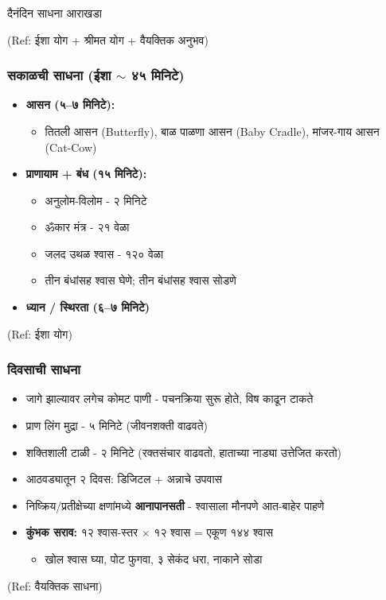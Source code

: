 \begin{frame}[fragile]\frametitle{}
\begin{center}
{\Large दैनंदिन साधना आराखडा}
\end{center}

{\tiny (Ref: ईशा योग + श्रीमत योग + वैयक्तिक अनुभव)}

\end{frame}

\begin{frame}[fragile]\frametitle{सकाळची साधना (ईशा $\sim$ ४५ मिनिटे)}

	\begin{itemize}
	\item \textbf{आसन (५--७ मिनिटे):}
		\begin{itemize}
		\item तितली आसन (Butterfly), बाळ पाळणा आसन (Baby Cradle), मांजर-गाय आसन (Cat-Cow)
		\end{itemize}
	\item \textbf{प्राणायाम + बंध (१५ मिनिटे):}
		\begin{itemize}
		\item अनुलोम-विलोम - २ मिनिटे
		\item ॐकार मंत्र - २१ वेळा
		\item जलद उथळ श्वास - १२० वेळा
		\item तीन बंधांसह श्वास घेणे; तीन बंधांसह श्वास सोडणे
		\end{itemize}
	\item \textbf{ध्यान / स्थिरता (६--७ मिनिटे)}
	\end{itemize}

{\tiny (Ref: ईशा योग)}

\end{frame}

\begin{frame}[fragile]\frametitle{दिवसाची साधना}

	\begin{itemize}
	\item जागे झाल्यावर लगेच कोमट पाणी - पचनक्रिया सुरू होते, विष काढून टाकते
	\item प्राण लिंग मुद्रा - ५ मिनिटे (जीवनशक्ती वाढवते)
	\item शक्तिशाली टाळी - २ मिनिटे (रक्तसंचार वाढवतो, हाताच्या नाड्या उत्तेजित करतो)
	\item आठवड्यातून २ दिवस: डिजिटल + अन्नाचे उपवास
	\item निष्क्रिय/प्रतीक्षेच्या क्षणांमध्ये \textbf{आनापानसती} - श्वासाला मौनपणे आत-बाहेर पाहणे
	\item \textbf{कुंभक सराव:} १२ श्वास-स्तर $\times$ १२ श्वास = एकूण १४४ श्वास
		\begin{itemize}
		\item खोल श्वास घ्या, पोट फुगवा, ३ सेकंद धरा, नाकाने सोडा
		\end{itemize}
	\end{itemize}

{\tiny (Ref: वैयक्तिक साधना)}

\end{frame}

